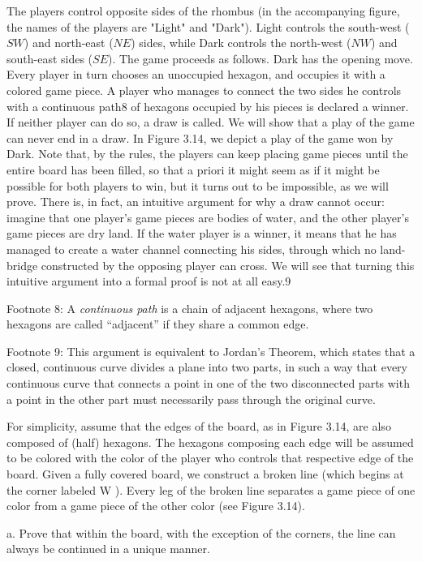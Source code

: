 \documentclass[10pt]{report}
\begin{document}
		The players control opposite sides of the rhombus (in the accompanying figure, the names of the players are "Light" and "Dark"). Light controls the south-west ($SW$) and north-east ($NE$) sides, while Dark controls the north-west ($NW$) and south-east sides ($SE$). The game proceeds as follows. Dark has the opening move. Every player in turn chooses an unoccupied hexagon, and occupies it with a colored game piece. A player who manages to connect the two sides he controls with a continuous path8 of hexagons occupied by his pieces is declared a winner. If neither player can do so, a draw is called. We will show that a play of the game can never end in a draw. In Figure 3.14, we depict a play of the game won by Dark. Note that, by the rules, the players can keep placing game pieces until the entire board has been filled, so that a priori it might seem as if it might be possible for both players to win, but it turns out to be impossible, as we will prove. There is, in fact, an intuitive argument for why a draw cannot occur: imagine that one player's game pieces are bodies of water, and the other player's game pieces are dry land. If the water player is a winner, it means that he has managed to create a water channel connecting his sides, through which no land-bridge constructed by the opposing player can cross. We will see that turning this intuitive argument into a formal proof is not at all easy.9

		Footnote 8: A \textit{continuous path} is a chain of adjacent hexagons, where two hexagons are called “adjacent” if they share a common edge.

		Footnote 9: This argument is equivalent to Jordan’s Theorem, which states that a closed, continuous curve divides a plane into two parts, in such a way that every continuous curve that connects a point in one of the two disconnected parts with a point in the other part must necessarily pass through the original curve.

		For simplicity, assume that the edges of the board, as in Figure 3.14, are also composed of (half) hexagons. The hexagons composing each edge will be assumed to be colored with the color of the player who controls that respective edge of the board. Given a fully covered board, we construct a broken line (which begins at the corner labeled W ). Every leg of the broken line separates a game piece of one color from a game piece of the other color (see Figure 3.14).

		a. Prove that within the board, with the exception of the corners, the line can always be continued in a unique manner.
\end{document}
